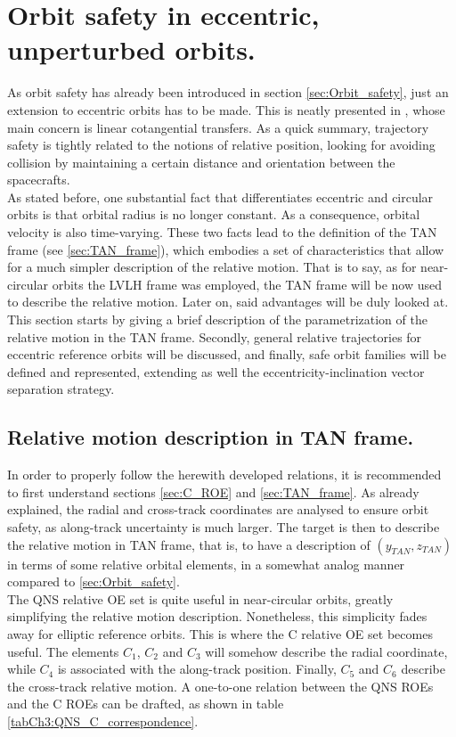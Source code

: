 		\FloatBarrier
\section{Orbit safety in eccentric, unperturbed orbits.}
%
\indent As orbit safety has already been introduced in section \ref{sec:Orbit_safety}, just an extension to eccentric orbits has to be made. This is neatly presented in \cite{Peters_Noomen}, whose main concern is linear cotangential transfers. As a quick summary, trajectory safety is tightly related to the notions of relative position, looking for avoiding collision by maintaining a certain distance and orientation between the spacecrafts.\\
%
\indent As stated before, one substantial fact that differentiates eccentric and circular orbits is that orbital radius is no longer constant. As a consequence, orbital velocity is also time-varying. These two facts lead to the definition of the TAN frame (see \ref{sec:TAN_frame}), which embodies a set of characteristics that allow for a much simpler description of the relative motion. That is to say, as for near-circular orbits the LVLH frame was employed, the TAN frame will be now used to describe the relative motion. Later on, said advantages will be duly looked at. \\
%
\indent This section starts by giving a brief description of the parametrization of the relative motion in the TAN frame. Secondly, general relative trajectories for eccentric reference orbits will be discussed, and finally, safe orbit families will be defined and represented, extending as well the eccentricity-inclination vector separation strategy.
%
	\subsection{Relative motion description in TAN frame.}
	\indent In order to properly follow the herewith developed relations, it is recommended to first understand sections \ref{sec:C_ROE} and \ref{sec:TAN_frame}. As already explained, the radial and cross-track coordinates are analysed to ensure orbit safety, as along-track uncertainty is much larger. The target is then to describe the relative motion in TAN frame, that is, to have a description of $(y_{TAN}, z_{TAN})$ in terms of some relative orbital elements, in a somewhat analog manner compared to \ref{sec:Orbit_safety}.\\
	\indent The QNS relative OE set is quite useful in near-circular orbits, greatly simplifying the relative motion description. Nonetheless, this simplicity fades away for elliptic reference orbits. This is where the C relative OE set becomes useful. The elements $C_1$, $C_2$ and $C_3$ will somehow describe the radial coordinate, while $C_4$ is associated with the along-track position. Finally, $C_5$ and $C_6$ describe the cross-track relative motion. A one-to-one relation between the QNS ROEs and the C ROEs can be drafted, as shown in table \ref{tabCh3:QNS_C_correspondence}.\\
	
